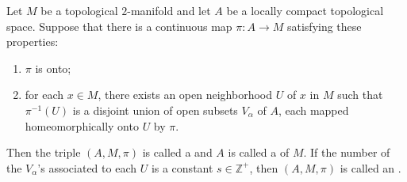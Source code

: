 Let $M$ be a topological $2$-manifold and let $A$ be a locally compact topological space. Suppose that there is a continuous map $\pi \colon A \to M$ satisfying these properties:

\begin{enumerate}
\item[(5.1.1)] $\pi$ is onto;
\item[(5.1.2)] for each $x \in M$, there exists an open neighborhood $U$ of $x$ in $M$ such that $\pi^{-1}(U)$ is a disjoint union of open subsets $V_{\alpha}$ of $A$, each mapped homeomorphically onto $U$ by $\pi$.
\end{enumerate}

Then the triple $(A, M, \pi)$ is called a  and $A$ is called a  of $M$. If the number of the $V_{\alpha}$'s associated to each $U$ is a constant $s \in \mathbb{Z}^{+}$, then $(A, M, \pi)$ is called an .
